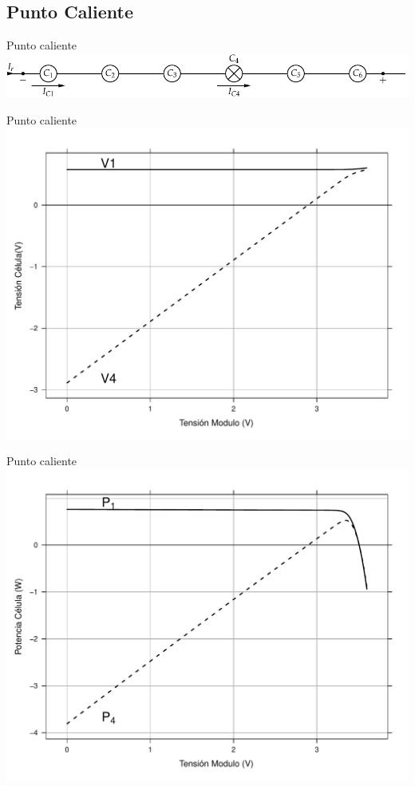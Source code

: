 \documentclass[xcolor={usenames,svgnames,dvipsnames}]{beamer}
\begin{document}
\subsection{Punto Caliente}
\label{sec-1-3}

\begin{frame}[label=sec-1-3-1]{Punto caliente}
\includegraphics[width=.9\linewidth]{../figs/AsociacionSerieCelulas.pdf}
\end{frame}

\begin{frame}[label=sec-1-3-2]{Punto caliente}
\includegraphics[width=.9\linewidth]{../figs/TensionCelula_Sombras.pdf}
\end{frame}

\begin{frame}[label=sec-1-3-3]{Punto caliente}
\includegraphics[width=.9\linewidth]{../figs/PotenciaCelula_Sombra.pdf}
\end{frame}
\end{document}
